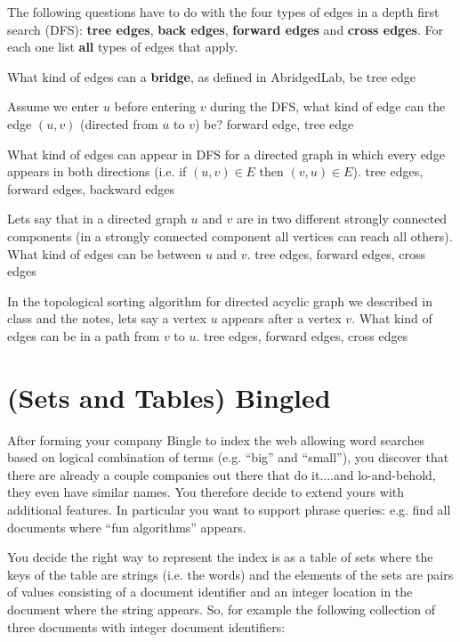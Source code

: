 \begin{problem}
%

The following questions have to do with the four types of edges in
a depth first search (DFS): \textbf{tree edges}, \textbf{back edges},
\textbf{forward edges} and \textbf{cross edges}.  For each one list
\textbf{all} types of edges that apply.


\ask[3]
What kind of edges can a \textbf{bridge}, as defined in AbridgedLab, be
\sol
tree edge

\ask[3]
Assume we enter $u$ before entering $v$ during the DFS, what kind of
edge can the edge $(u,v)$ (directed from $u$ to $v$) be?
\sol
forward edge, tree edge


\ask[3]
What kind of edges can appear in DFS for a directed graph in which
every edge appears in both directions (i.e. if $(u,v) \in E$ then $(v,u)
\in E$).
\sol
tree edges, forward edges, backward edges


\ask[3] Lets say that in a directed graph $u$ and $v$ are in two
different strongly connected components (in a strongly connected
component all vertices can reach all others).  What kind of edges can
be between $u$ and $v$.
\sol
tree edges, forward edges, cross edges

\ask[3]
In the topological sorting algorithm for directed acyclic graph we
described in class and the notes, lets say a vertex $u$ appears
after a vertex $v$.  What kind of edges can be in a path
from $v$ to $u$.
\sol
tree edges, forward edges, cross edges

\end{problem}




\section{(Sets and Tables) Bingled}


%

After forming your company Bingle to index the web allowing word
searches based on logical combination of terms (e.g. ``big'' and
``small''), you discover that there are already a couple companies out
there that do it....and lo-and-behold, they even have similar names.
You therefore decide to extend yours with additional features.  In
particular you want to support phrase queries: e.g. find all
documents where ``fun algorithms'' appears.

You decide the right way to represent the index is as a table of sets
where the keys of the table are strings (i.e. the words) and the
elements of the sets are pairs of values consisting of a document
identifier and an integer location in the document where the string
appears.  So, for example the following collection of three documents
with integer document identifiers:


